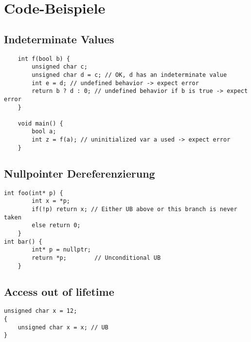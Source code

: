 \lstset{language=cpp}

\section{Code-Beispiele}
\label{sec:codebsp}

\subsection{Indeterminate Values}
\label{subsec:indeterminate}
\begin{lstlisting}
    int f(bool b) {
        unsigned char c;
        unsigned char d = c; // OK, d has an indeterminate value 
        int e = d; // undefined behavior -> expect error
        return b ? d : 0; // undefined behavior if b is true -> expect error
    }
    
    void main() {
        bool a;
        int z = f(a); // uninitialized var a used -> expect error
    }
\end{lstlisting}
\cite[S.63 f.]{book:cpp-standard}

\subsection{Nullpointer Dereferenzierung}
\label{subsec:nullpointer}

\begin{lstlisting}
int foo(int* p) {
        int x = *p;
        if(!p) return x; // Either UB above or this branch is never taken
        else return 0;
    }
int bar() {
        int* p = nullptr;
        return *p;        // Unconditional UB
    }
\end{lstlisting}
\cite{misc:cpp-undefined}

\subsection{Access out of lifetime}
\label{subsec:outside-lifetime}

\begin{lstlisting}
unsigned char x = 12;
{ 
    unsigned char x = x; // UB
}
\end{lstlisting}
\cite[S.35]{book:cpp-standard}
